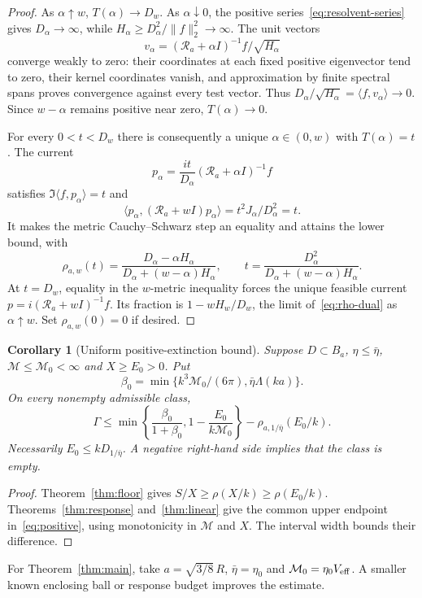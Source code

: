 \documentclass[11pt]{article}
\newtheorem{corollary}[theorem]{Corollary}
\newcommand{\ip}[2]{\langle #1,#2\rangle}
\newcommand{\norm}[1]{\lVert #1\rVert}
\begin{document}
\begin{proof}
As $\alpha\uparrow w$, $T(\alpha)\to D_w$. As $\alpha\downarrow0$, the positive series~\eqref{eq:resolvent-series} gives $D_\alpha\to\infty$, while $H_\alpha\geq D_\alpha^2/\norm f_2^2\to\infty$. The unit vectors
\[
 v_\alpha=(\mathcal R_a+\alpha I)^{-1}f/\sqrt{H_\alpha}
\]
converge weakly to zero: their coordinates at each fixed positive eigenvector tend to zero, their kernel coordinates vanish, and approximation by finite spectral spans proves convergence against every test vector. Thus $D_\alpha/\sqrt{H_\alpha}=\ip f{v_\alpha}\to0$. Since $w-\alpha$ remains positive near zero, $T(\alpha)\to0$.

For every $0<t<D_w$ there is consequently a unique $\alpha\in(0,w)$ with $T(\alpha)=t$. The current
\begin{equation}\label{eq:optimizer}
 p_\alpha=\frac{it}{D_\alpha}(\mathcal R_a+\alpha I)^{-1}f
\end{equation}
satisfies $\Im\ip f{p_\alpha}=t$ and
\[
 \ip{p_\alpha}{(\mathcal R_a+wI)p_\alpha}
 =t^2J_\alpha/D_\alpha^2=t.
\]
It makes the metric Cauchy--Schwarz step an equality and attains the lower bound, with
\begin{equation}\label{eq:rho-primal}
 \rho_{a,w}(t)=\frac{D_\alpha-\alpha H_\alpha}{D_\alpha+(w-\alpha)H_\alpha},
 \qquad t=\frac{D_\alpha^2}{D_\alpha+(w-\alpha)H_\alpha}.
\end{equation}
At $t=D_w$, equality in the $w$-metric inequality forces the unique feasible current $p=i(\mathcal R_a+wI)^{-1}f$. Its fraction is $1-wH_w/D_w$, the limit of~\eqref{eq:rho-dual} as $\alpha\uparrow w$. Set $\rho_{a,w}(0)=0$ if desired.
\end{proof}

\begin{corollary}[Uniform positive-extinction bound]\label{cor:positive}
Suppose $D\subset B_a$, $\eta\leq\bar\eta$, $\mathcal M\leq\mathcal M_0<\infty$ and $X\geq E_0>0$. Put
\[
 \beta_0=\min\{k^3\mathcal M_0/(6\pi),\bar\eta\Lambda(ka)\}.
\]
On every nonempty admissible class,
\begin{equation}\label{eq:positive}
 \Gamma\leq\min\left\{\frac{\beta_0}{1+\beta_0},
                          1-\frac{E_0}{k\mathcal M_0}\right\}
             -\rho_{a,1/\bar\eta}(E_0/k).
\end{equation}
Necessarily $E_0\leq kD_{1/\bar\eta}$. A negative right-hand side implies that the class is empty.
\end{corollary}
\begin{proof}
Theorem~\ref{thm:floor} gives $S/X\geq\rho(X/k)\geq\rho(E_0/k)$. Theorems~\ref{thm:response} and~\ref{thm:linear} give the common upper endpoint in~\eqref{eq:positive}, using monotonicity in $\mathcal M$ and $X$. The interval width bounds their difference.
\end{proof}
For Theorem~\ref{thm:main}, take $a=\sqrt{3/8}\,R$, $\bar\eta=\eta_0$ and $\mathcal M_0=\eta_0V_{\rm eff}$. A smaller known enclosing ball or response budget improves the estimate.
\end{document}

